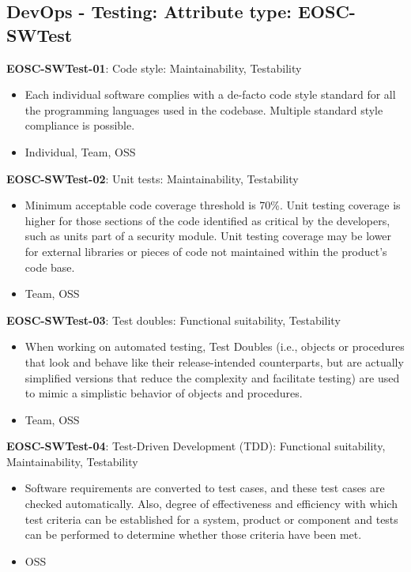 \subsection{DevOps - Testing: Attribute type: EOSC-SWTest}

\textbf{EOSC-SWTest-01}: Code style: Maintainability, Testability

\begin{itemize}
    \item Each individual software complies with a de-facto code style standard for all the programming languages used in the codebase. Multiple standard style compliance is possible. \cite{orviz_set_2017,raymond_software_2013}
    \item Individual, Team, OSS
\end{itemize}

\textbf{EOSC-SWTest-02}: Unit tests: Maintainability, Testability

\begin{itemize}
    \item Minimum acceptable code coverage threshold is 70\%. Unit testing coverage is higher for those sections of the code identified as critical by the developers, such as units part of a security module. Unit testing coverage may be lower for external libraries or pieces of code not maintained within the product's code base. \cite{aberdour_achieving_2007,nagappan_early_2005,boehm_quantitative_1976,shepherdson_cessda_2019,orviz_set_2017,raymond_software_2013}
    \item Team, OSS
\end{itemize}

\textbf{EOSC-SWTest-03}: Test doubles: Functional suitability, Testability

\begin{itemize}
    \item When working on automated testing,  Test Doubles (i.e., objects or procedures that look and behave like their release-intended 
counterparts, but are actually simplified versions that reduce the 
complexity and facilitate testing) are used to mimic a simplistic behavior of objects and procedures. \cite{orviz_set_2017,orviz_fernandez_eosc-synergy_2020}
    \item Team, OSS
\end{itemize}

\textbf{EOSC-SWTest-04}: Test-Driven Development (TDD): Functional suitability, Maintainability, Testability

\begin{itemize}
    \item Software requirements are converted to test cases, and these test cases are checked automatically. Also, degree of effectiveness and efficiency with which test criteria can be established for a system, product or
component and tests can be performed to determine whether those criteria have been met. \cite{iso_25010_2011_2017,crispin_driving_2006,zuser_software_2005,orviz_set_2017}
    \item OSS
\end{itemize}


